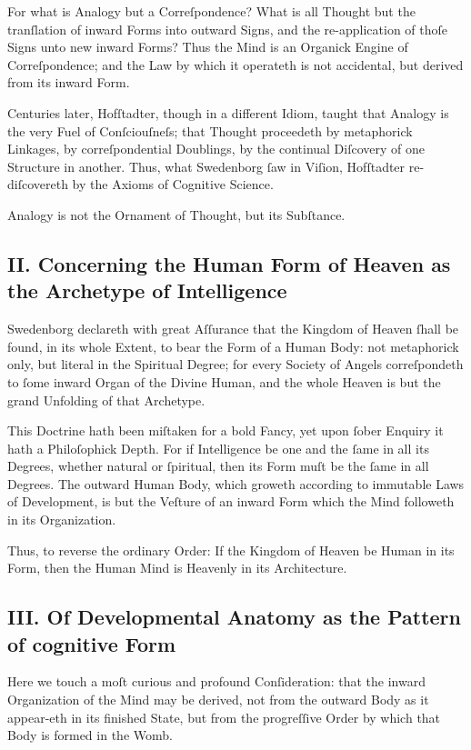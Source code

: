 \documentclass[12pt]{article}
\begin{document}
For what is Analogy but a Correſpondence? What is all Thought but the 
tranſlation of inward Forms into outward Signs, and the re-application of 
thoſe Signs unto new inward Forms? Thus the Mind is an Organick Engine of 
Correſpondence; and the Law by which it operateth is not accidental, but 
derived from its inward Form.

Centuries later, Hofſtadter, though in a different Idiom, taught that Analogy 
is the very Fuel of Conſciouſneſs; that Thought proceedeth by metaphorick 
Linkages, by correſpondential Doublings, by the continual Diſcovery of one 
Structure in another. Thus, what Swedenborg ſaw in Viſion, Hofſtadter 
re-diſcovereth by the Axioms of Cognitive Science.

Analogy is not the Ornament of Thought, but its Subſtance.

\subsection*{II. Concerning the Human Form of Heaven as the Archetype of Intelligence}

Swedenborg declareth with great Aſſurance that the Kingdom of Heaven ſhall be 
found, in its whole Extent, to bear the Form of a Human Body: not metaphorick 
only, but literal in the Spiritual Degree; for every Society of Angels 
correſpondeth to ſome inward Organ of the Divine Human, and the whole Heaven 
is but the grand Unfolding of that Archetype.

This Doctrine hath been miſtaken for a bold Fancy, yet upon ſober Enquiry it 
hath a Philoſophick Depth. For if Intelligence be one and the ſame in all its 
Degrees, whether natural or ſpiritual, then its Form muſt be the ſame in all 
Degrees. The outward Human Body, which groweth according to immutable Laws of 
Development, is but the Veſture of an inward Form which the Mind followeth in 
its Organization.

Thus, to reverse the ordinary Order: If the Kingdom of Heaven be Human in its 
Form, then the Human Mind is Heavenly in its Architecture.

\subsection*{III. Of Developmental Anatomy as the Pattern of cognitive Form}

Here we touch a moſt curious and profound Conſideration: that the inward 
Organization of the Mind may be derived, not from the outward Body as it 
appear-eth in its finished State, but from the progreſſive Order by which that 
Body is formed in the Womb.
\end{document}
